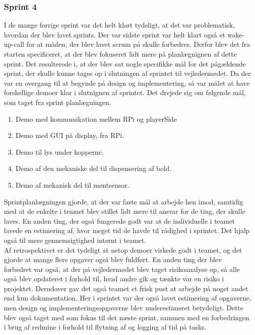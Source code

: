 \documentclass[a4paper,12pt,fleqn,oneside]{article}
\begin{document}
\subsubsection{Sprint 4}
I de mange forrige sprint var det helt klart tydeligt, at det var problematisk, hvordan der blev lavet sprints. Der var sidste sprint var helt klart også et wake-up-call for at måden, der blev lavet scrum på skulle forbedres. Derfor blev det fra starten specificeret, at der blev fokuseret lidt mere på planlægnignen af dette sprint. Det resulterede i, at der blev sat nogle specifikke mål for det pågældende sprint, der skulle kunne tages op i slutningen af sprintet til vejledermødet. Da der var en overgang til at begynde på design og implementering, så var målet at have forskellige demoer klar i slutnignen af sprintet. Det drejede sig om følgende mål, som taget fra sprint planlægningen.
\begin{enumerate}
    \item Demo med kommunikation mellem RPi og playerSide
    \item Demo med GUI på display, fra RPi.
    \item Demo til lys under kopperne.
    \item Demo af den mekaniske del til dispensering af bold.
    \item Demo af mekanisk del til møntsensor.
\end{enumerate}
Sprintplanlægningen gjorde, at der var faste mål at arbejde hen imod, samtidig med at de enkelte i teamet blev stillet lidt mere til ansvar for de ting, der skulle laves. En anden ting, der også fungerede godt var at de individuelle i teamet lavede en estimering af, hvor meget tid de havde til rådighed i sprintet. Det hjalp også til mere gennemsigtighed internt i teamet.
\\Af retrospektivet er det tydeligt at netop demoer virkede godt i teamet, og det gjorde at mange flere opgaver også blev fuldført. En anden ting der blev forbedret var også, at der på vejledermødet blev taget risikoanalyse op, så alle også blev opdateret i forhold til, hvad andre gik og tænkte var en risiko i projektet. Derudover gav det også teamet et frisk pust at arbejde på noget andet end kun dokumentation. Her i sprintet var der også lavet estimering af opgaverne, men design og implementeringsopgaverne blev underestimeret betydeligt. Dette blev også taget med som fokus til det næste sprint, sammen med en forbedringen i brug af redmine i forhold til flytning af og logging af tid på tasks.
\end{document}
